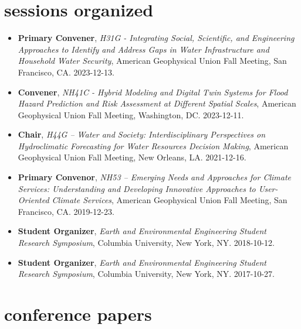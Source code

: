 \documentclass[10pt,oneside]{article}
\begin{document}

\section{sessions organized}

\mbox{}\vspace{-\dimexpr\baselineskip\relax}

\begin{itemize}[label={}]
  
  \item \textbf{Primary Convener}, \textit{H31G - Integrating Social, Scientific, and Engineering Approaches to Identify and Address Gaps in Water Infrastructure and Household Water Security}, American Geophysical Union Fall Meeting, San Francisco, CA. 2023-12-13.
        
  \item \textbf{Convener}, \textit{NH41C - Hybrid Modeling and Digital Twin Systems for Flood Hazard Prediction and Risk Assessment at Different Spatial Scales}, American Geophysical Union Fall Meeting, Washington, DC. 2023-12-11.
        
  \item \textbf{Chair}, \textit{H44G -- Water and Society: Interdisciplinary Perspectives on Hydroclimatic Forecasting for Water Resources Decision Making}, American Geophysical Union Fall Meeting, New Orleans, LA. 2021-12-16.
        
  \item \textbf{Primary Convenor}, \textit{NH53 -- Emerging Needs and Approaches for Climate Services: Understanding and Developing Innovative Approaches to User-Oriented Climate Services}, American Geophysical Union Fall Meeting, San Francisco, CA. 2019-12-23.
        
  \item \textbf{Student Organizer}, \textit{Earth and Environmental Engineering Student Research Symposium}, Columbia University, New York, NY. 2018-10-12.
        
  \item \textbf{Student Organizer}, \textit{Earth and Environmental Engineering Student Research Symposium}, Columbia University, New York, NY. 2017-10-27.
        
\end{itemize}

\section{conference papers}
\end{document}
